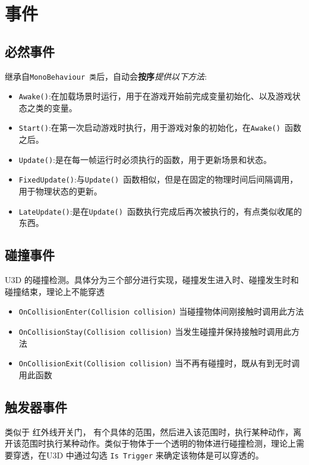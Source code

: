 \documentclass[UTF8,a4paper,12pt]{ctexbook}
\begin{document}
\chapter{事件}
	\section{必然事件}
		继承自\verb|MonoBehaviour 类|后，自动会\textbf{按序}\textit{提供以下方法}:
		
		\begin{itemize}
			\item \verb|Awake()|:在加载场景时运行，用于在游戏开始前完成变量初始化、以及游戏状态之类的变量。
			\item \verb|Start()|:在第一次启动游戏时执行，用于游戏对象的初始化，在\verb|Awake() |函数之后。
			\item \verb|Update()|:是在每一帧运行时必须执行的函数，用于更新场景和状态。
			\item \verb|FixedUpdate()|:与\verb|Update() |函数相似，但是在固定的物理时间后间隔调用，用于物理状态的更新。
			\item \verb|LateUpdate()|:是在\verb|Update() |函数执行完成后再次被执行的，有点类似收尾的东西。 
		\end{itemize}
			
	\section{碰撞事件}
		U3D 的碰撞检测。具体分为三个部分进行实现，碰撞发生进入时、碰撞发生时和碰撞结束，理论上不能穿透
		
		\begin{itemize}
			\item \verb|OnCollisionEnter(Collision collision)| 当碰撞物体间刚接触时调用此方法
			\item \verb|OnCollisionStay(Collision collision)| 当发生碰撞并保持接触时调用此方法
			\item \verb|OnCollisionExit(Collision collision)| 当不再有碰撞时，既从有到无时调用此函数
		\end{itemize}

	\section{触发器事件}
		类似于 红外线开关门， 有个具体的范围，然后进入该范围时，执行某种动作，离开该范围时执行某种动作。类似于物体于一个透明的物体进行碰撞检测，理论上需要穿透，在U3D 中通过勾选 \verb|Is Trigger| 来确定该物体是可以穿透的。
		
\end{document}
